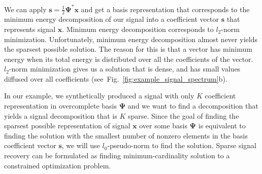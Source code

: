 \documentclass[journal]{IEEEtran}
\begin{document}


We can apply $\boldsymbol{s}=\frac{1}{2}\boldsymbol{\Psi^*}\boldsymbol{x}$ and get a basis representation that corresponds to the minimum energy decomposition of our signal into a coefficient vector $\boldsymbol{s}$ that represents signal $\boldsymbol{x}$. Minimum energy decomposition corresponds to $l_2$-norm minimization. Unfortunately, minimum energy decomposition almost never yields the sparsest possible solution. The reason for this is that a vector has minimum energy when its total energy is distributed over all the coefficients of the vector. $l_2$-norm minimization gives us a solution that is dense, and has small values diffused over all coefficients (see~Fig.~\ref{fig:example_signal_spectrum}b).

In our example, we synthetically produced a signal with only $K$ coefficient representation in overcomplete basis $\boldsymbol{\Psi}$ and we want to find a decomposition that yields a signal decomposition that is $K$ sparse. Since the goal of finding the sparsest possible representation of signal $\boldsymbol{x}$ over some basis $\boldsymbol{\Psi}$ is equivalent to finding the solution with the smallest number of nonzero elements in the basis coefficient vector $\boldsymbol{s}$, we will use $l_0$-pseudo-norm to find the solution. Sparse signal recovery can be formulated as finding minimum-cardinality solution to a constrained optimization problem. 


\end{document}
